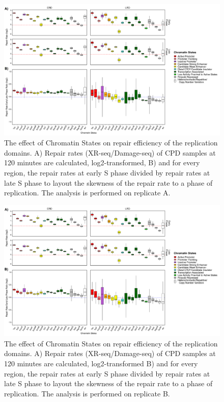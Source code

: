 \begin{figure}[H]
\begin{center}
\includegraphics[width=\textwidth]{Chapters/7_appendix/figures/supfig16}
\caption[The effect of Chromatin States on repair efficiency of the replication domains for CPD samples at 120 minutes (replicate A).]{The effect of Chromatin States on repair efficiency of the replication domains. A) Repair rates (XR-seq/Damage-seq) of CPD samples at 120 minutes are calculated, log2-transformed, B) and for every region, the repair rates at early S phase divided by repair rates at late S phase to layout the skewness of the repair rate to a phase of replication. The analysis is performed on replicate A.}
\label{supfig:chromatin4}
\end{center}
\end{figure}

\begin{figure}[H]
\begin{center}
\includegraphics[width=\textwidth]{Chapters/7_appendix/figures/supfig17}
\caption[The effect of Chromatin States on repair efficiency of the replication domains for CPD samples at 120 minutes (replicate B).]{The effect of Chromatin States on repair efficiency of the replication domains. A) Repair rates (XR-seq/Damage-seq) of CPD samples at 120 minutes are calculated, log2-transformed B) and for every region, the repair rates at early S phase divided by repair rates at late S phase to layout the skewness of the repair rate to a phase of replication. The analysis is performed on replicate B.}
\label{supfig:chromatin5}
\end{center}
\end{figure}

